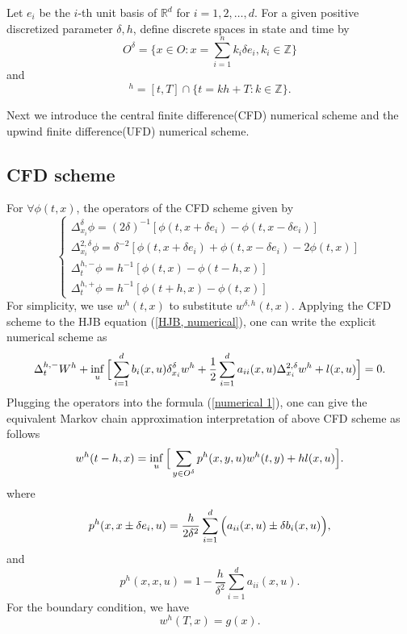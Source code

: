 \documentclass{article}
\begin{document}
Let $e_{i}$ be the $i$-th unit basis of $\mathbb{R}^{d}$ for $i = 1, 2, \dots, d$. For a given positive discretized parameter $\delta, h$, define discrete spaces in state and time by
\begin{equation}
    O^{\delta} = \{x \in O: x = \sum_{i = 1}^{n} k_{i} \delta e_{i}, k_{i} \in \mathbb{Z} \}
\end{equation}
and
\begin{equation}
    [t, T]^{h} = [t, T] \cap \{t = k h + T: k \in \mathbb{Z} \}.
\end{equation}

Next we introduce the central finite difference(CFD) numerical scheme and the upwind finite difference(UFD) numerical scheme.

\subsection{CFD scheme} 

For $\forall \phi(t, x)$, the operators of the CFD scheme given by
\begin{equation*}
    \begin{cases}
    \Delta_{x_{i}}^{\delta} \phi = (2 \delta)^{-1}[\phi(t, x + \delta e_{i}) - \phi(t, x -  \delta e_{i})] \\
    \Delta_{x_{i}}^{2, \delta} \phi = \delta^{-2}[\phi(t, x + \delta e_{i}) + \phi(t, x -  \delta e_{i}) - 2 \phi(t, x)] \\
    \Delta_{t}^{h, -}\phi = h^{-1} [\phi(t, x) - \phi(t-h, x)] \\
    \Delta_{t}^{h, +}\phi = h^{-1} [\phi(t+h, x) - \phi(t, x)]
    \end{cases}
\end{equation*}
For simplicity, we use $w^{h}(t, x)$ to substitute $w^{\delta, h}(t, x)$. Applying the CFD scheme to the HJB equation (\ref{HJB, numerical}), one can write the explicit numerical scheme as
\begin{equation} \label{numerical 1}
\Delta_{t}^{h, -} W^{h} + \inf_{u} \Big{[} \sum_{i = 1}^{d} b_{i} (x, u) \delta_{x_{i}}^{\delta} w^{h} + \frac{1}{2} \sum_{i = 1}^{d} a_{ii} (x, u) \Delta_{x_{i}}^{2, \delta} w^{h} + l(x, u) \Big{]} = 0.
\end{equation}
Plugging the operators into the formula (\ref{numerical 1}), one can give the equivalent Markov chain approximation interpretation of above CFD scheme as follows
\begin{equation}
    w^{h} (t - h, x) = \inf_{u} \Big{[} \sum_{y \in O^{\delta}} p^{h}(x, y, u) w^{h}(t, y) + h l(x, u) \Big{]}.
\end{equation}
where
\begin{equation*}
    p^{h}(x, x \pm \delta e_{i}, u) = \frac{h}{2 \delta^{2}} \sum_{i = 1}^{d} \Big{(} a_{ii}(x, u) \pm \delta b_{i}(x, u) \Big{)},
\end{equation*}
and 
\begin{equation*}
    p^{h}(x, x, u) = 1 - \frac{h}{\delta^{2}} \sum_{i = 1}^{d} a_{ii} (x, u).
\end{equation*}
For the boundary condition, we have
\begin{equation*}
w^{h} (T, x) = g(x).
\end{equation*}
\end{document}
